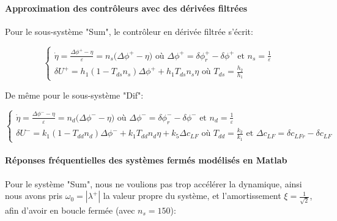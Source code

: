 \documentclass{report}
\begin{document}
\paragraph{Approximation des contrôleurs avec des dérivées filtrées}

Pour le sous-système "Sum", le contrôleur en dérivée filtrée s'écrit:

\begin{equation*}
    \begin{cases}
        \dot{\eta} = \frac{\Delta \phi^+ - \eta}{\varepsilon}
        =  n_s\big(\Delta \phi^+ - \eta \big) 
        \text{ où } \Delta \phi^+ = \delta \phi^+_r - \delta \phi^+
        \text{ et } n_s = \frac{1}{\varepsilon} \\
        \delta{U^+} = h_1(1 - T_{ds}n_s)\Delta \phi^+ +
        h_1T_{ds}n_s\eta \text{ où } T_{ds} = \frac{h_2}{h_1} 
    \end{cases}
\end{equation*}

De même pour le sous-système "Dif":

\begin{equation*}
    \begin{cases}
        \dot{\eta} = \frac{\Delta \phi^- - \eta}{\varepsilon}
        =  n_d\big(\Delta \phi^- - \eta \big) 
        \text{ où } \Delta \phi^- = \delta \phi^-_r - \delta \phi^-
        \text{ et } n_d = \frac{1}{\varepsilon} \\
        \delta{U^-} = k_1(1 - T_{dd}n_d)\Delta \phi^- +
        k_1T_{dd}n_d\eta + k_5 \Delta c_{LF}\text{ où } T_{dd} = \frac{k_2}{k_1} \text{ et }
        \Delta c_{LF} = \delta c_{LFr} - \delta c_{LF}
    \end{cases}
\end{equation*}

\paragraph{Réponses fréquentielles des systèmes fermés modélisés 
en Matlab}

Pour le système "Sum", nous ne voulions pas trop accélérer la dynamique,
ainsi nous avons pris $\omega_0 = |\lambda^+|$ la valeur propre du système,
et l'amortissement $\xi = \frac{1}{\sqrt{2}}$, afin d'avoir en boucle fermée
(avec $n_s=150$):
\end{document}
